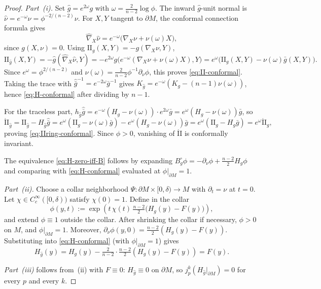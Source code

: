\documentclass[11pt,reqno,a4paper]{amsart}
\numberwithin{equation}{section}
\theoremstyle{plain}
\theoremstyle{remark}
\theoremstyle{plain}
\begin{document}
\begin{proof}
\emph{Part~(i).}
Set $\hat g=e^{2\omega}g$ with $\omega=\frac{2}{n-2}\log\phi$.
The inward $\hat g$-unit normal is
$\hat\nu=e^{-\omega}\nu=\phi^{-2/(n-2)}\nu$.
For $X,Y$ tangent to $\partial M$, the conformal connection formula gives
\[
\hat\nabla_X\hat\nu
=e^{-\omega}\bigl(\nabla_X\nu+\nu(\omega)X\bigr),
\]
since $g(X,\nu)=0$.
Using $\mathrm{II}_g(X,Y)=-g(\nabla_X\nu,Y)$,
\[
\mathrm{II}_{\hat g}(X,Y)
=-\hat g(\hat\nabla_X\hat\nu,Y)
=-e^{2\omega}g\bigl(e^{-\omega}(\nabla_X\nu+\nu(\omega)X),Y\bigr)
=e^\omega\bigl(\mathrm{II}_g(X,Y)-\nu(\omega)\bar g(X,Y)\bigr).
\]
Since $e^\omega=\phi^{2/(n-2)}$ and
$\nu(\omega)=\frac{2}{n-2}\phi^{-1}\partial_\nu\phi$,
this proves \eqref{eq:II-conformal}.
Taking the trace with
$\hat{\bar g}^{-1}=e^{-2\omega}\bar g^{-1}$
gives
$K_{\hat g}=e^{-\omega}(K_g-(n-1)\nu(\omega))$,
hence \eqref{eq:H-conformal} after dividing by $n-1$.

For the traceless part,
$h_{\hat g}\hat{\bar g}
=e^{-\omega}(H_g-\nu(\omega))\cdot e^{2\omega}\bar g
=e^{\omega}(H_g-\nu(\omega))\bar g$,
so
\[
\mathring{\mathrm{II}}_{\hat g}
=\mathrm{II}_{\hat g}-H_{\hat g}\hat{\bar g}
=e^\omega(\mathrm{II}_g-\nu(\omega)\bar g)
-e^\omega(H_g-\nu(\omega))\bar g
=e^\omega(\mathrm{II}_g-H_g\bar g)
=e^\omega\mathring{\mathrm{II}}_g,
\]
proving \eqref{eq:IIring-conformal}.
Since $\phi>0$, vanishing of $\mathring{\mathrm{II}}$ is conformally invariant.

The equivalence \eqref{eq:H-zero-iff-B} follows by
expanding $B_g^\circ\phi=-\partial_\nu\phi+\frac{n-2}{2}H_g\phi$
and comparing with \eqref{eq:H-conformal} evaluated at $\phi|_{\partial M}=1$.

\smallskip
\emph{Part~(ii).}
Choose a collar neighborhood
$\Psi\colon\partial M\times[0,\delta)\to M$
with $\partial_t=\nu$ at $t=0$.
Let $\chi\in C^\infty_c([0,\delta))$ satisfy $\chi(0)=1$.
Define in the collar
\[
\phi(y,t):=\exp\!\left(
t\,\chi(t)\,\tfrac{n-2}{2}\bigl(H_g(y)-F(y)\bigr)
\right),
\]
and extend $\phi\equiv1$ outside the collar.
After shrinking the collar if necessary, $\phi>0$ on $M$, and
$\phi|_{\partial M}=1$.
Moreover,
$\partial_\nu\phi(y,0)
=\frac{n-2}{2}(H_g(y)-F(y))$.
Substituting into \eqref{eq:H-conformal} (with $\phi|_{\partial M}=1$) gives
\[
H_{\hat g}(y)
=H_g(y)-\tfrac{2}{n-2}\cdot\tfrac{n-2}{2}(H_g(y)-F(y))
=F(y).
\]

\smallskip
\emph{Part~(iii)} follows from~(ii) with $F\equiv0$:
$H_{\hat g}\equiv0$ on $\partial M$,
so $j_p^k(H_{\hat g}|_{\partial M})=0$ for every $p$ and every $k$.


\end{proof}
\end{document}
